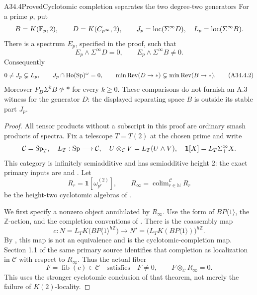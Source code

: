 \begin{claim}{A34.4}{Proved}{Cyclotomic completion separates the two degree-two generators}\label{A344}
For a prime $p$, put
\[
 B=K(\mathbb F_p,2),\qquad D=K(C_{p^\infty},2),\qquad
 J_p=\operatorname{loc}(\Sigma^\infty D),\quad
 L_p=\operatorname{loc}(\Sigma^\infty B).
\]
There is a spectrum $E_p$, specified in the proof, such that
\[
 E_p\wedge\Sigma^\infty D=0,
 \qquad E_p\wedge\Sigma^\infty B\ne0.
 \tag{A34.4.1}
\]
Consequently
\[
 0\ne J_p\subsetneq L_p,\qquad
 J_p\cap\mathrm{Ho}(\mathrm{Sp})^\omega=0,
 \qquad
 \min\operatorname{Rev}(D\to*)
 \subsetneq\min\operatorname{Rev}(B\to*).
 \tag{A34.4.2}
\]
Moreover $P_D\Sigma^kB\not\simeq *$ for every $k\geq0$.
These comparisons do not furnish an A.3 witness for the generator $D$:
the displayed separating space $B$ is outside its stable part $J_p$.
\end{claim}
\begin{proof}
All tensor products without a subscript in this proof are ordinary
smash products of spectra.  Fix a telescope $T=T(2)$ at the chosen
prime and write
\[
 \mathcal C=\mathrm{Sp}_{T},\quad L_T:\mathrm{Sp}\longrightarrow\mathcal C,
 \quad U\otimes_{\mathcal C}V=L_T(U\wedge V),\quad
 \mathbf1[X]=L_T\Sigma^\infty_+X.
\]
This category is infinitely semiadditive and has semiadditive height
$2$: the exact primary inputs are
\citet[arXiv v3, Theorem 5.3.1]{A3CSYAmbidexterity2022}
and \citet[arXiv v2, Theorem 4.4.5]{A3CSYHeight2020}.
Let
\[
 R_r=\mathbf1[\omega^{(2)}_{p^r}],\qquad
 R_\infty=\mathop{\operatorname{colim}}_{r\in\mathbb N}^{\mathcal C}R_r
\]
be the height-two cyclotomic algebras of
\citet[Definitions 4.7 and 4.10]{A3CSYCyclotomic2024}.

We first specify a nonzero object annihilated by $R_\infty$.
Use the form of $BP\langle1\rangle$, the $\mathbb Z$-action,
and the completion conventions of
\citet[Convention 5.1 and Theorem 5.4]{A3BHLS2023}.
There is the coassembly map
\[
 c:N=L_TK\bigl(BP\langle1\rangle^{h\mathbb Z}\bigr)
 \longrightarrow
 N'=\bigl(L_TK(BP\langle1\rangle)\bigr)^{h\mathbb Z}.
 \tag{A34.4.3}
\]
By \citet[Theorem 6.25, with $n=1$ and $k=0$]{A3BHLS2023},
this map is not an equivalence and is the cyclotomic-completion
map.  Section 1.1 of the same primary source identifies that
completion as localization in $\mathcal C$ with respect to
$R_\infty$.  Thus the actual fiber
\[
 F=\operatorname{fib}(c)\in\mathcal C
 \quad\text{satisfies}\quad
 F\ne0,\qquad F\otimes_{\mathcal C}R_\infty=0.
 \tag{A34.4.4}
\]
This uses the stronger cyclotomic conclusion of that theorem,
not merely the failure of $K(2)$-locality.


\end{proof}
